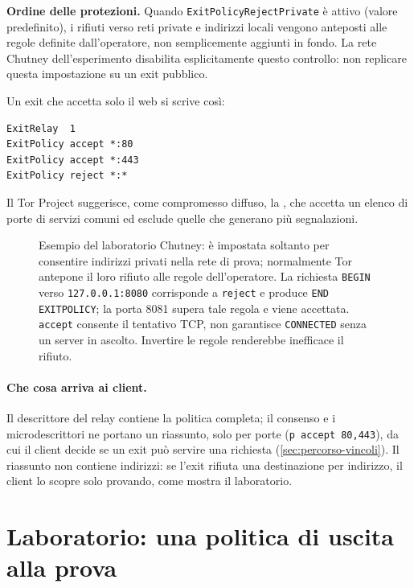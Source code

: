 \textbf{Ordine delle protezioni.} Quando \texttt{ExitPolicyRejectPrivate} è attivo (valore predefinito), i rifiuti verso reti private e indirizzi locali vengono anteposti alle regole definite dall'operatore, non semplicemente aggiunti in fondo. La rete Chutney dell'esperimento disabilita esplicitamente questo controllo: non replicare questa impostazione su un exit pubblico.

Un exit che accetta solo il web si scrive così:
\begin{lstlisting}[numbers=none]
ExitRelay  1
ExitPolicy accept *:80
ExitPolicy accept *:443
ExitPolicy reject *:*
\end{lstlisting}
Il Tor Project suggerisce, come compromesso diffuso, la , che accetta un elenco di porte di servizi comuni ed esclude quelle che generano più segnalazioni.

\begin{figure}[htbp]
\centering

\caption{Esempio del laboratorio Chutney:  è impostata soltanto per consentire indirizzi privati nella rete di prova; normalmente Tor antepone il loro rifiuto alle regole dell'operatore. La richiesta \texttt{BEGIN} verso \texttt{127.0.0.1:8080} corrisponde a \texttt{reject} e produce \texttt{END EXITPOLICY}; la porta 8081 supera tale regola e viene accettata. \texttt{accept} consente il tentativo TCP, non garantisce \texttt{CONNECTED} senza un server in ascolto. Invertire le regole renderebbe inefficace il rifiuto.}
\label{fig:policy}
\end{figure}

\paragraph{Che cosa arriva ai client.} Il descrittore del relay contiene la politica completa; il consenso e i microdescrittori ne portano un riassunto, solo per porte (\texttt{p accept 80,443}), da cui il client decide se un exit può servire una richiesta (\cref{sec:percorso-vincoli}). Il riassunto non contiene indirizzi: se l'exit rifiuta una destinazione per indirizzo, il client lo scopre solo provando, come mostra il laboratorio.

\section{Laboratorio: una politica di uscita alla prova}\label{sec:lab-relay}

